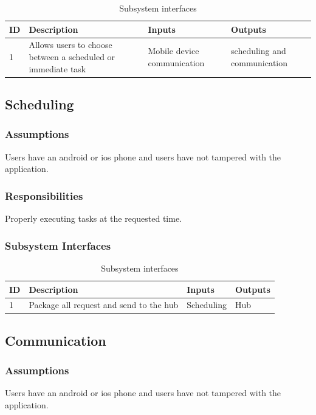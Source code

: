 \begin {table}[H]
\caption {Subsystem interfaces} 
\begin{center}
    \begin{tabular}{ | p{1cm} | p{7cm} | p{4cm} | p{5cm} |}
    \hline
    ID & Description & Inputs & Outputs \\ \hline
    1 &Allows users to choose between a scheduled or immediate task& Mobile device communication & scheduling and communication \\ \hline
    \end{tabular}
\end{center}
\end{table}

\subsection{Scheduling}
\subsubsection{Assumptions}
Users have an android or ios phone and users have not tampered with the application. 

\subsubsection{Responsibilities}
Properly executing tasks at the requested time.

\subsubsection{Subsystem Interfaces}

\begin {table}[H]
\caption {Subsystem interfaces} 
\begin{center}
    \begin{tabular}{ | p{1cm} | p{7cm} | p{4cm} | p{3cm} |}
    \hline
    ID & Description & Inputs & Outputs \\ \hline
    1 &Package all request and send to the hub&Scheduling &Hub\\ \hline
    \end{tabular}
\end{center}
\end{table}

\subsection{Communication}
\subsubsection{Assumptions}
Users have an android or ios phone and users have not tampered with the application. 

